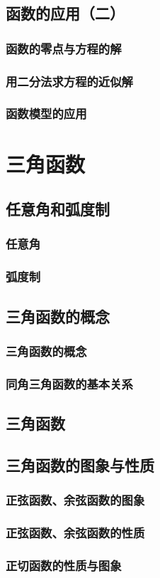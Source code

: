 \documentclass[no-math,10pt]{ctexbook}
\begin{document}
\section{函数的应用（二）}
\subsection{函数的零点与方程的解}
\subsection{用二分法求方程的近似解}
\subsection{函数模型的应用}
	\chapter{三角函数}
\section{任意角和弧度制}
\subsection{任意角}
\subsection{弧度制}
\section{三角函数的概念}
\subsection{三角函数的概念}
\subsection{同角三角函数的基本关系}
\section{三角函数}
\section{三角函数的图象与性质}
\subsection{正弦函数、余弦函数的图象}
\subsection{正弦函数、余弦函数的性质}
\subsection{正切函数的性质与图象}
\end{document}
